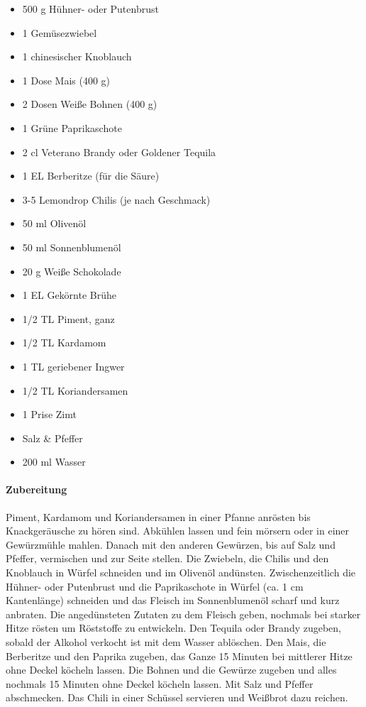 \begin{itemize}[noitemsep]
	\item  500 g Hühner- oder Putenbrust
	\item 1 Gemüsezwiebel
	\item 1 chinesischer Knoblauch
	\item 1 Dose Mais (400 g)
	\item 2 Dosen Weiße Bohnen (400 g)
	\item 1 Grüne Paprikaschote
	\item 2 cl Veterano Brandy oder Goldener Tequila
	\item 1 EL Berberitze (für die Säure)
	\item 3-5 Lemondrop Chilis (je nach Geschmack)
	\item 50 ml Olivenöl
	\item 50 ml Sonnenblumenöl
	\item 20 g Weiße Schokolade
	\item 1 EL Gekörnte Brühe
	\item 1/2 TL Piment, ganz
	\item 1/2 TL Kardamom
	\item 1 TL geriebener Ingwer
	\item 1/2 TL Koriandersamen
	\item 1 Prise Zimt
	\item Salz \& Pfeffer
	\item 200 ml Wasser
\end{itemize}

\paragraph{Zubereitung}

Piment, Kardamom und Koriandersamen in einer Pfanne anrösten bis Knackgeräusche zu hören sind. Abkühlen lassen und fein mörsern oder in einer Gewürzmühle mahlen. Danach mit den anderen Gewürzen, bis auf Salz und Pfeffer, vermischen und zur Seite stellen.
Die Zwiebeln, die Chilis und den Knoblauch in Würfel schneiden und im Olivenöl andünsten. Zwischenzeitlich die Hühner- oder Putenbrust und die Paprikaschote in Würfel (ca. 1 cm Kantenlänge) schneiden und das Fleisch im Sonnenblumenöl scharf und kurz anbraten.
Die angedünsteten Zutaten zu dem Fleisch geben, nochmals bei starker Hitze rösten um Röststoffe zu entwickeln. Den Tequila oder Brandy zugeben, sobald der Alkohol verkocht ist mit dem Wasser ablöschen. Den Mais, die Berberitze  und den Paprika zugeben, das Ganze 15 Minuten bei mittlerer Hitze ohne Deckel köcheln lassen.  
Die Bohnen und die Gewürze zugeben und alles nochmals 15 Minuten ohne Deckel köcheln lassen. Mit Salz und Pfeffer abschmecken.
Das Chili in einer Schüssel servieren und Weißbrot dazu reichen.
\newpage

